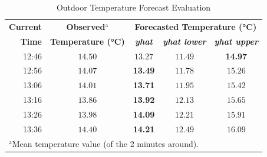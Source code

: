 \documentclass[conference]{IEEEtran}
\begin{document}
\begin{table}[htbp]
    \caption{Outdoor Temperature Forecast Evaluation}
    \begin{center}
        \begin{tabular}{|r||c||c|c|c|}
            \hline
            \textbf{Current} & \textbf{Observed}$^{\mathrm{a}}$ & \multicolumn{3}{|c|}{\textbf{Forecasted Temperature (°C)}} \\
            \cline{3-5}
            \textbf{Time} & \textbf{Temperature (°C)} & \textbf{\textit{yhat}} & \textbf{\textit{yhat lower}} & \textbf{\textit{yhat upper}} \\
            \hline
            \hline
            12:46 & $14.50$ & $13.27$ & $11.49$ & \textbf{14.97} \\
            \hline
            12:56 & $14.07$ & \textbf{13.49} & $11.78$ & $15.26$ \\
            \hline
            13:06 & $14.01$ & \textbf{13.71} & $11.95$ & $15.42$ \\
            \hline
            13:16 & $13.86$ & \textbf{13.92} & $12.13$ & $15.65$ \\
            \hline
            13:26 & $13.98$ & \textbf{14.09} & $12.21$ & $15.91$ \\
            \hline
            13:36 & $14.40$ & \textbf{14.21} & $12.49$ & $16.09$ \\
            \hline
            \multicolumn{4}{l}{$^{\mathrm{a}}$Mean temperature value (of the 2 minutes around).}
        \end{tabular}
        \label{tab_forecast_outdoor}
    \end{center}
\end{table}
\end{document}
